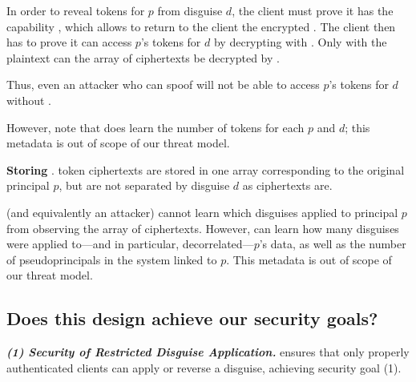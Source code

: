 In order to reveal tokens for $p$ from disguise $d$, the client must prove it has the capability
,
which allows \sys to return to the client the encrypted . The client then has to prove it
can access $p$'s tokens for $d$ by decrypting  with .  Only with the plaintext
 can the array of  ciphertexts be decrypted by \sys.

Thus, even an attacker who can spoof  will not be able to access $p$'s tokens for $d$ without
.

However, note that \sys does learn the number of  tokens for each $p$ and $d$; this
metadata is out of scope of our threat model.

\vspace{6pt}\noindent\textbf{Storing }.
 token ciphertexts are stored in one array corresponding to the original principal $p$, but are not
separated by disguise $d$ as  ciphertexts are.

\sys (and equivalently an attacker) cannot learn which disguises applied to principal $p$ from
observing the array of  ciphertexts. However, \sys can learn how many disguises were
applied to---and in particular, decorrelated---$p$'s data, as well as the number of pseudoprincipals
in the system linked to $p$. This metadata is out of scope of our threat model.



\subsection{Does this design achieve our security goals?}
\label{sec:achievegoals}
\vspace{6pt}\noindent\textbf{\emph{(1) Security of Restricted Disguise Application.}}
\sys ensures that only properly authenticated clients can apply or
reverse a disguise, achieving security goal (1).

